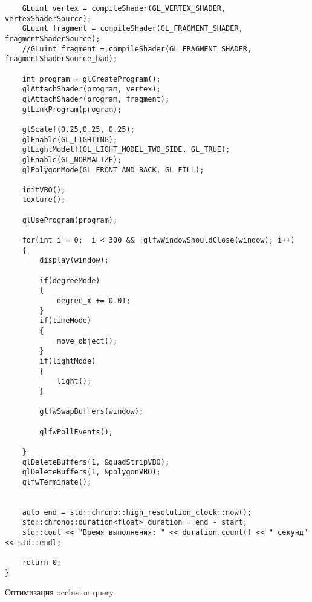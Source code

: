 \documentclass[a4paper, 14pt]{extarticle}
\begin{document}
\begin{verbatim}
    GLuint vertex = compileShader(GL_VERTEX_SHADER, vertexShaderSource);
    GLuint fragment = compileShader(GL_FRAGMENT_SHADER, fragmentShaderSource);
    //GLuint fragment = compileShader(GL_FRAGMENT_SHADER, fragmentShaderSource_bad); 

    int program = glCreateProgram();
    glAttachShader(program, vertex);
    glAttachShader(program, fragment);
    glLinkProgram(program);

    glScalef(0.25,0.25, 0.25);
    glEnable(GL_LIGHTING);
    glLightModelf(GL_LIGHT_MODEL_TWO_SIDE, GL_TRUE);
    glEnable(GL_NORMALIZE);
    glPolygonMode(GL_FRONT_AND_BACK, GL_FILL);

    initVBO();
    texture();

    glUseProgram(program);

    for(int i = 0;  i < 300 && !glfwWindowShouldClose(window); i++)
    {
        display(window);

        if(degreeMode)
        {
            degree_x += 0.01;
        }
        if(timeMode)
        {
            move_object();
        }
        if(lightMode)
        {
            light();
        }

        glfwSwapBuffers(window);

        glfwPollEvents();

    }
    glDeleteBuffers(1, &quadStripVBO);
    glDeleteBuffers(1, &polygonVBO);
    glfwTerminate();


    auto end = std::chrono::high_resolution_clock::now();
    std::chrono::duration<float> duration = end - start;
    std::cout << "Время выполнения: " << duration.count() << " секунд" << std::endl;

    return 0;
}
\end{verbatim}

\begin{center}
\Large {Оптимизация occlusion query} \\ 
\end{center}\normalsize
\end{document}
